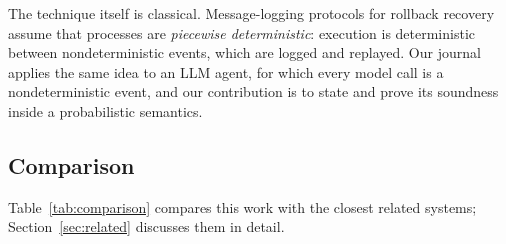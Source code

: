 The technique itself is classical.
Message-logging protocols for rollback recovery~\citep{strom1985optimistic,elnozahy2002survey}
assume that processes are \emph{piecewise deterministic}: execution is deterministic between
nondeterministic events, which are logged and replayed.
Our journal applies the same idea to an LLM agent, for which every model call is a
nondeterministic event, and our contribution is to state and prove its soundness inside a
probabilistic semantics.

\subsection{Comparison}

Table~\ref{tab:comparison} compares this work with the closest related systems;
Section~\ref{sec:related} discusses them in detail.

\begin{table}[ht]
\centering
\caption{Comparison with the closest related systems.
  \checkmark~= supported, $\times$~= not supported, $\sim$~= partial.}
\label{tab:comparison}
\end{table}
